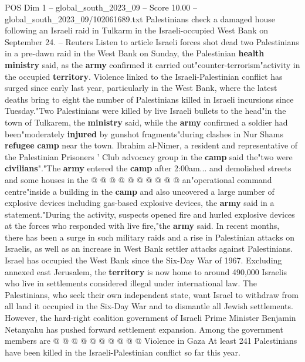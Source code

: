 \begin{textsample}{POS Dim 1 – global\_south\_2023\_09 – Score 10.00 – global\_south\_2023\_09/102061689.txt}  \label{ex:f1_pos_443}
Palestinians check a damaged house following an Israeli raid in Tulkarm in the Israeli-occupied West Bank on September 24. -- Reuters Listen to article Israeli forces shot dead two Palestinians in a pre-dawn raid in the West Bank on Sunday, the Palestinian \textbf{health} \textbf{ministry} said, as the \textbf{army} confirmed it carried out"counter-terrorism"activity in the occupied \textbf{territory}.
Violence linked to the Israeli-Palestinian conflict has surged since early last year, particularly in the West Bank, where the latest deaths bring to eight the number of Palestinians killed in Israeli incursions since Tuesday."Two Palestinians were killed by live Israeli bullets to the head"in the town of Tulkarem, the \textbf{ministry} said, while the \textbf{army} confirmed a soldier had been"moderately \textbf{injured} by gunshot fragments"during clashes in Nur Shams \textbf{refugee} \textbf{camp} near the town.
Ibrahim al-Nimer, a resident and representative of the Palestinian Prisoners ' Club advocacy group in the \textbf{camp} said the"two were \textbf{civilians}"."The \textbf{army} entered the \textbf{camp} after 2:00am... and demolished streets and some houses in the @ @ @ @ @ @ @ @ @ @ an"operational command centre"inside a building in the \textbf{camp} and also uncovered a large number of explosive devices including gas-based explosive devices, the \textbf{army} said in a statement."During the activity, suspects opened fire and hurled explosive devices at the forces who responded with live fire,"the \textbf{army} said.
In recent months, there has been a surge in such military raids and a rise in Palestinian attacks on Israelis, as well as an increase in West Bank settler attacks against Palestinians.
Israel has occupied the West Bank since the Six-Day War of 1967.
Excluding annexed east Jerusalem, the \textbf{territory} is now home to around 490,000 Israelis who live in settlements considered illegal under international law.
The Palestinians, who seek their own independent state, want Israel to withdraw from all land it occupied in the Six-Day War and to dismantle all Jewish settlements.
However, the hard-right coalition government of Israeli Prime Minister Benjamin Netanyahu has pushed forward settlement expansion.
Among the government members are @ @ @ @ @ @ @ @ @ @ Violence in Gaza At least 241 Palestinians have been killed in the Israeli-Palestinian conflict so far this year.

\end{textsample}
